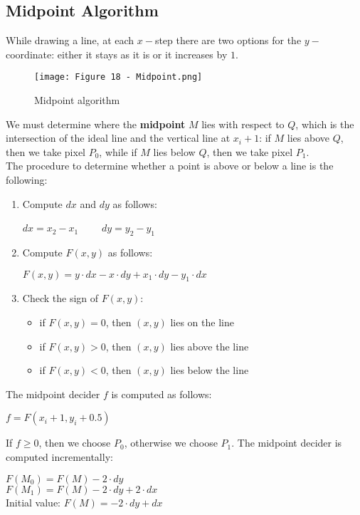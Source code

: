 \documentclass{article}
\begin{document}
\subsection{Midpoint Algorithm}
While drawing a line, at each $x-$step there are two options for the $y-$coordinate: either it stays as it is or it increases by $1$.
\begin{figure}[H]
    \centering
    \texttt{[image: Figure 18 - Midpoint.png]}
    \caption{Midpoint algorithm}
\end{figure}
\noindent
We must determine where the \textbf{midpoint} $M$ lies with respect to $Q$, which is the intersection of the ideal line and the vertical line at $x_i + 1$: if $M$ lies above $Q$, then we take pixel $P_0$, while if $M$ lies below $Q$, then we take pixel $P_1$. \\
The procedure to determine whether a point is above or below a line is the following:
\begin{enumerate}
    \item Compute $dx$ and $dy$ as follows:
        \begin{center}
            $dx = x_2 - x_1$ \ \ \ \ $dy = y_2 - y_1$
        \end{center}
    \item Compute $F(x,y)$ as follows:
        \begin{center}
            $F(x,y) = y \cdot dx - x \cdot dy + x_1 \cdot dy - y_1 \cdot dx$
        \end{center}
    \item Check the sign of $F(x,y)$:
        \begin{itemize}
            \item if $F(x,y) = 0$, then $(x,y)$ lies on the line 
            \item if $F(x,y) > 0$, then $(x,y)$ lies above the line 
            \item if $F(x,y) < 0$, then $(x,y)$ lies below the line 
        \end{itemize}
\end{enumerate}
The midpoint decider $f$ is computed as follows:
\begin{center}
    $f = F(x_i + 1, y_i + 0.5)$
\end{center}
If $f \geq 0$, then we choose $P_0$, otherwise we choose $P_1$.
\newpage
The midpoint decider is computed incrementally:
\begin{center}
    $F(M_0) = F(M) - 2 \cdot dy$ \\
    $F(M_1) = F(M) - 2 \cdot dy + 2 \cdot dx$ \\
    Initial value: $F(M) = - 2 \cdot dy + dx $
\end{center}
\end{document}
